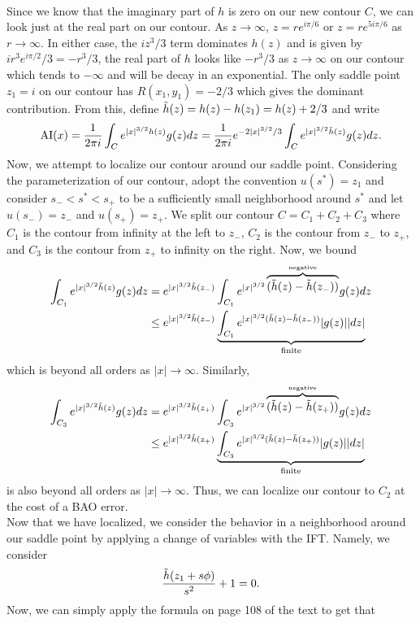 \documentclass{article}
\begin{document}
\\
Since we know that the imaginary part of $h$ is zero on our new contour $C$, we can look just at the real part on our contour. As $z\to\infty$, $z=re^{i\pi/6}$ or $z=re^{5i\pi/6}$ as $r\to\infty$. In either case, the $iz^3/3$ term dominates $h(z)$ and is given by $ir^3e^{i\pi/2}/3=-r^3/3$, the real part of $h$ looks like $-r^3/3$ as $z\to\infty$ on our contour which tends to $-\infty$ and will be decay in an exponential. The only saddle point $z_1=i$ on our contour has $R(x_1,y_1)=-2/3$ which gives the dominant contribution. From this, define $\Tilde{h}(z)=h(z)-h(z_1)=h(z)+2/3$ and write
\[
\mathrm{AI}(x)=\frac{1}{2 \pi i} \int_C e^{|x|^{3/2}h(z)}g(z)dz=\frac{1}{2 \pi i} e^{-2|x|^{3/2}/3}\int_C e^{|x|^{3/2}\Tilde{h}(z)}g(z)dz.
\]
Now, we attempt to localize our contour around our saddle point. Considering the parameterization of our contour, adopt the convention $u(s^*)=z_1$ and consider $s_-<s^*<s_+$ to be a sufficiently small neighborhood around $s^*$ and let $u(s_-)=z_-$ and $u(s_+)=z_+$. We split our contour $C=C_1+C_2+C_3$ where $C_1$ is the contour from infinity at the left to $z_-$, $C_2$ is the contour from $z_-$ to $z_+$, and $C_3$ is the contour from $z_+$ to infinity on the right. Now, we bound
\begin{align*}
\int_{C_1}e^{|x|^{3/2}\Tilde{h}(z)}g(z)dz&=e^{|x|^{3/2}\Tilde{h}(z_-)}\int_{C_1}e^{|x|^{3/2}\overbrace{(\Tilde{h}(z)-\Tilde{h}(z_-))}^{\text{negative}}}g(z)dz\\&\leq
e^{|x|^{3/2}\Tilde{h}(z_-)}\underbrace{\int_{C_1}e^{|x|^{3/2}(\Tilde{h}(z)-\Tilde{h}(z_-))}|g(z)||dz|}_{\text{finite}}
\end{align*}
which is beyond all orders as $|x|\to\infty$. Similarly,
\begin{align*}
\int_{C_3}e^{|x|^{3/2}\Tilde{h}(z)}g(z)dz&=e^{|x|^{3/2}\Tilde{h}(z_+)}\int_{C_3}e^{|x|^{3/2}\overbrace{(\Tilde{h}(z)-\Tilde{h}(z_+))}^{\text{negative}}}g(z)dz\\&\leq
e^{|x|^{3/2}\Tilde{h}(z_+)}\underbrace{\int_{C_3}e^{|x|^{3/2}(\Tilde{h}(z)-\Tilde{h}(z_+))}|g(z)||dz|}_{\text{finite}}
\end{align*}
is also beyond all orders as $|x|\to\infty$. Thus, we can localize our contour to $C_2$ at the cost of a BAO error. \\
Now that we have localized, we consider the behavior in a neighborhood around our saddle point by applying a change of variables with the IFT. Namely, we consider 
\[
\frac{\Tilde{h}(z_1+s\phi)}{s^2}+1=0.
\]
Now, we can simply apply the formula on page 108 of the text to get that
\end{document}
